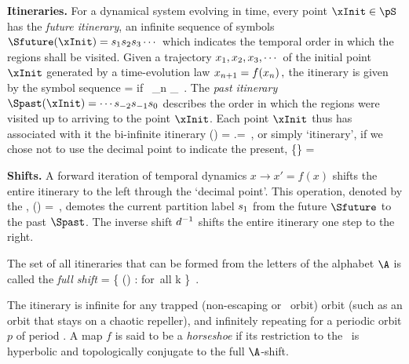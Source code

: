{\bf Itineraries.}
For a dynamical system evolving in time,
every {\statesp} point $\xInit \in \pS$ has the {\em future itinerary},
an infinite sequence of symbols
$\Sfuture(\xInit)=\Ssym{1}\Ssym{2}\Ssym{3}\cdots$ which indicates the
temporal order in which the regions shall be visited. Given a trajectory
$x_1,x_2,x_3,\cdots$ of the initial point $\xInit$ generated
by a time-evolution law
\( %
   \ssp_{n+1}=f(\ssp_n)
\,,
\) %
the itinerary is given by the symbol sequence
\beq
    = \Ssym{} \qquad \mbox{if\ } \qquad  \ssp_n \in \pS_{\Ssym{}}
 \,.
The {\em past itinerary} $\Spast(\xInit)=\cdots\Ssym{-2}
\Ssym{-1}\Ssym{0} $ describes the order in which the regions were visited
up to arriving to the point $\xInit$. Each point $\xInit$ thus has
associated with it the bi-infinite itinerary
\beq
\Sbiinf(\xInit) %
        = \Spast.\Sfuture  =
\,,
or simply `itinerary', if we chose not to use the decimal point
to indicate the present,
\beq
   \{\Ssym{\zeit}\} = \cdots{} \cdots
{}


{\bf Shifts.}
A forward iteration of temporal dynamics $x\rightarrow x' = f(x)$ shifts
the entire itinerary to the left through the `decimal point'. This
operation, denoted by the {\shiftOp} \shift{},
\beq
   \shift{}()
     =  
\,,
demotes the current partition label ${s_{1}}$ from the future $\Sfuture$
to the past $\Spast$.
The inverse shift $d{}^{-1}$ shifts the entire itinerary one step
to the right.

The set of all itineraries that can be formed from the letters of the
alphabet $\A$ is called the {\em full shift}
\beq
\hat{\AdmItnr} = \{ ()
              :  \in \A \quad \mbox{for all} \quad k \in  \integers \}
\,.

The itinerary is infinite for any trapped (non-escaping or \nws\ orbit) orbit
(such as an orbit that stays on a chaotic
repeller), and infinitely repeating for a periodic orbit $p$ of period .
A map $f$ is said to be a \emph{horseshoe} if its restriction to the \nws\ is
hyperbolic and topologically conjugate to the full $\A$-shift.

